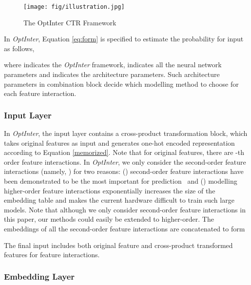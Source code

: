 \documentclass[conference]{IEEEtran}
\begin{document}
\begin{figure}[!htbp]
\centering
\texttt{[image: fig/illustration.jpg]}
\caption{The OptInter CTR Framework}
\label{fig:illustration}
\end{figure}

In \textit{OptInter}, Equation \ref{eq:form} is specified to estimate the probability for input  as follows,

where  indicates the \textit{OptInter} framework,  indicates all the neural network parameters and  indicates the architecture parameters. Such architecture parameters in combination block decide which modelling method to choose for each feature interaction.


\subsubsection{Input Layer}
\label{input}

In \textit{OptInter}, the input layer contains a cross-product transformation block, which takes original features  as input and generates one-hot encoded representation  according to Equation \ref{memorized}. Note that for  original features, there are  -th order feature interactions. In \textit{OptInter}, we only consider the second-order feature interactions (namely, ) for two reasons: () second-order feature interactions have been demonstrated to be the most important for prediction~\cite{AutoFeature} and () modelling higher-order feature interactions exponentially increases the size of the embedding table and makes the current hardware difficult to train such large models. 
Note that although we only consider second-order feature interactions in this paper, our methods could easily be extended to higher-order. The embeddings of all the second-order feature interactions are concatenated to form



The final input includes both original feature  and cross-product transformed features  for feature interactions.


\subsubsection{Embedding Layer}
\label{embedding}
\end{document}
